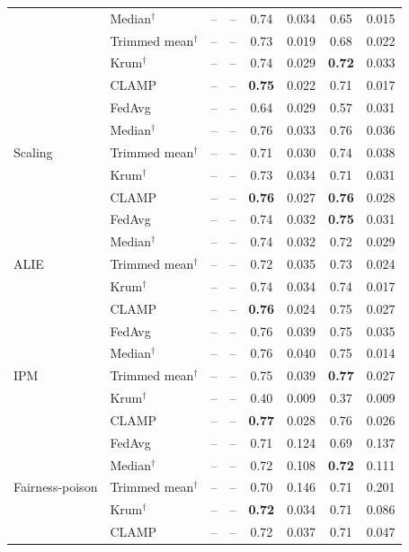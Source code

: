 \begin{table}[t]
\begin{tabular}{llcccccc}
 & Median$^\dagger$ & -- & -- & 0.74 & 0.034 & 0.65 & 0.015 \\
 & Trimmed mean$^\dagger$ & -- & -- & 0.73 & 0.019 & 0.68 & 0.022 \\
 & Krum$^\dagger$ & -- & -- & 0.74 & 0.029 & \textbf{0.72} & 0.033 \\
 & CLAMP & -- & -- & \textbf{0.75} & 0.022 & 0.71 & 0.017 \\
\midrule
\multirow{5}{*}{Scaling} & FedAvg & -- & -- & 0.64 & 0.029 & 0.57 & 0.031 \\
 & Median$^\dagger$ & -- & -- & 0.76 & 0.033 & 0.76 & 0.036 \\
 & Trimmed mean$^\dagger$ & -- & -- & 0.71 & 0.030 & 0.74 & 0.038 \\
 & Krum$^\dagger$ & -- & -- & 0.73 & 0.034 & 0.71 & 0.031 \\
 & CLAMP & -- & -- & \textbf{0.76} & 0.027 & \textbf{0.76} & 0.028 \\
\midrule
\multirow{5}{*}{ALIE} & FedAvg & -- & -- & 0.74 & 0.032 & \textbf{0.75} & 0.031 \\
 & Median$^\dagger$ & -- & -- & 0.74 & 0.032 & 0.72 & 0.029 \\
 & Trimmed mean$^\dagger$ & -- & -- & 0.72 & 0.035 & 0.73 & 0.024 \\
 & Krum$^\dagger$ & -- & -- & 0.74 & 0.034 & 0.74 & 0.017 \\
 & CLAMP & -- & -- & \textbf{0.76} & 0.024 & 0.75 & 0.027 \\
\midrule
\multirow{5}{*}{IPM} & FedAvg & -- & -- & 0.76 & 0.039 & 0.75 & 0.035 \\
 & Median$^\dagger$ & -- & -- & 0.76 & 0.040 & 0.75 & 0.014 \\
 & Trimmed mean$^\dagger$ & -- & -- & 0.75 & 0.039 & \textbf{0.77} & 0.027 \\
 & Krum$^\dagger$ & -- & -- & 0.40 & 0.009 & 0.37 & 0.009 \\
 & CLAMP & -- & -- & \textbf{0.77} & 0.028 & 0.76 & 0.026 \\
\midrule
\multirow{5}{*}{Fairness-poison} & FedAvg & -- & -- & 0.71 & 0.124 & 0.69 & 0.137 \\
 & Median$^\dagger$ & -- & -- & 0.72 & 0.108 & \textbf{0.72} & 0.111 \\
 & Trimmed mean$^\dagger$ & -- & -- & 0.70 & 0.146 & 0.71 & 0.201 \\
 & Krum$^\dagger$ & -- & -- & \textbf{0.72} & 0.034 & 0.71 & 0.086 \\
 & CLAMP & -- & -- & 0.72 & 0.037 & 0.71 & 0.047 \\
\bottomrule
\end{tabular}
\end{table}
